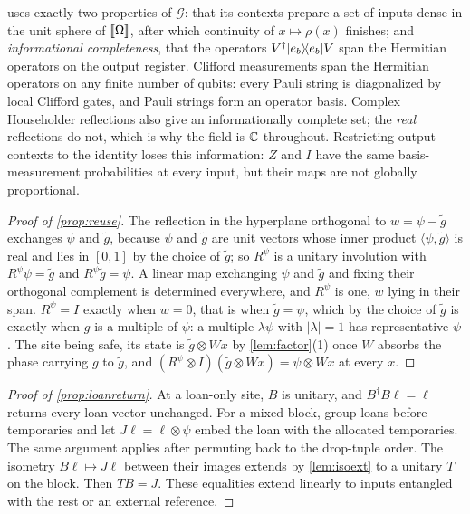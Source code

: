 \documentclass[acmsmall,screen,review,anonymous,nonacm]{acmart}
\begin{document}
 uses exactly two properties of $\mathcal G$: that its contexts
prepare a set of inputs dense in the unit sphere of $[\![\Omega]\!]$, after
which continuity of $x \mapsto \rho(x)$ finishes; and \emph{informational
completeness}, that the operators $V^{\dagger}\lvert e_b \rangle\!\langle e_b \rvert V$ span the Hermitian
operators on the output register. Clifford measurements span the Hermitian operators on any finite number of
qubits: every Pauli string is diagonalized by local Clifford gates, and
Pauli strings form an operator basis. Complex Householder reflections
also give an informationally complete set; the \emph{real}
reflections do not, which is why the field is $\mathbb{C}$ throughout. Restricting output contexts to the identity loses this information:
$Z$ and $I$ have the same basis-measurement probabilities at every
input, but their maps are not globally proportional.

\begin{proof}[Proof of \cref{prop:reuse}]
The reflection in the hyperplane orthogonal to $w = \psi - \tilde g$ exchanges $\psi$ and
$\tilde g$, because $\psi$ and $\tilde g$ are unit vectors whose inner product
$\langle\psi, \tilde g\rangle$ is real and lies in $[0,1]$ by the choice of
$\tilde g$; so $R^{\psi}$ is a unitary involution with $R^{\psi}\psi = \tilde g$
and $R^{\psi}\tilde g = \psi$. A linear map exchanging $\psi$ and $\tilde g$ and fixing their orthogonal
complement is determined everywhere, and $R^{\psi}$ is one, $w$ lying in their span. $R^{\psi} = I$ exactly when $w = 0$, that is
when $\tilde g = \psi$, which by the choice of $\tilde g$ is exactly when
$g$ is a multiple of $\psi$: a multiple $\lambda\psi$ with $|\lambda| = 1$ has
representative $\psi$. The site being safe, its state is $\tilde g \otimes Wx$ by
\cref{lem:factor}(1) once $W$ absorbs the phase carrying $g$ to
$\tilde g$, and $(R^{\psi} \otimes I)(\tilde g \otimes Wx) =
\psi \otimes Wx$ at every $x$.
\end{proof}

\begin{proof}[Proof of \cref{prop:loanreturn}]
At a loan-only site, $B$ is unitary, and
$B^{\dagger}B\ell=\ell$ returns every loan vector unchanged.
For a mixed block, group loans before temporaries and let
$J\ell=\ell\otimes\psi$ embed the loan with the allocated temporaries.
The same argument applies after permuting back to the drop-tuple order. The isometry $B\ell\mapsto J\ell$ between their
images extends by \cref{lem:isoext} to a unitary $T$ on the block.
Then $TB=J$. These equalities extend linearly to inputs entangled with the
rest or an external reference.
\end{proof}
\end{document}
